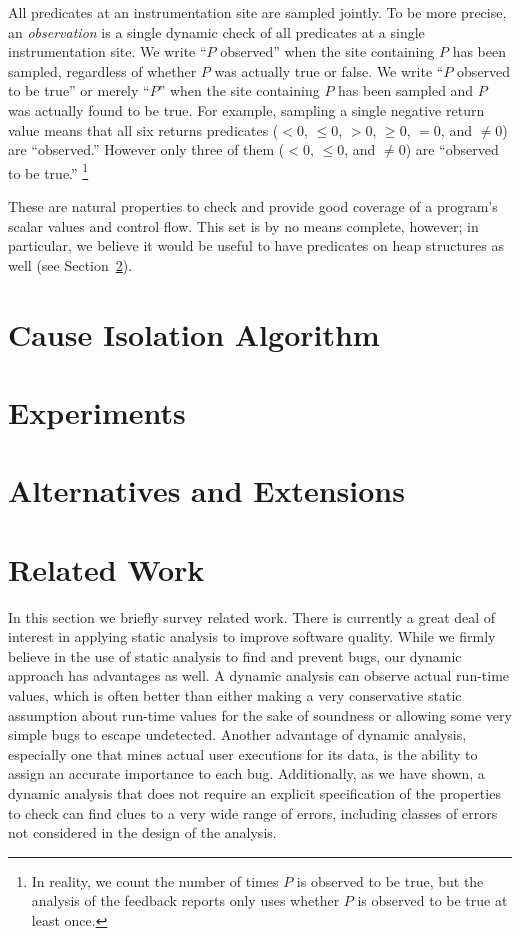 \documentclass[preprint,final]{sigplanconf}
\newcommand{\termdef}[1]{\emph{#1}}
\begin{document}
All predicates at an instrumentation site are sampled jointly.  To be
more precise, an \termdef{observation} is a single dynamic check of
all predicates at a single instrumentation site.  We write ``$P$
observed'' when the site containing $P$ has been sampled, regardless
of whether $P$ was actually true or false.  We write ``$P$ observed to
be true'' or merely ``$P$'' when the site containing $P$ has been
sampled and $P$ was actually found to be true.  For example, sampling
a single negative return value means that all six returns predicates
($< 0$, $\leq 0$, $> 0$, $\geq 0$, $= 0$, and $\neq 0$) are
``observed.''  However only three of them ($< 0$, $\leq 0$, and $\neq
0$) are ``observed to be true.''  \footnote{In reality, we count the
number of times $P$ is observed to be true, but the analysis of the
feedback reports only uses whether $P$ is observed to be true at least
once.}

  These are natural properties to check and provide good coverage of a
  program's scalar values and control flow.  This set is by no means
  complete, however; in particular, we believe it would be useful to have
  predicates on heap structures as well (see Section~\ref{sec:experiments}).

\section{Cause Isolation Algorithm}
\label{sec:algorithm}


\section{Experiments}
\label{sec:experiments}


\section{Alternatives and Extensions}
\label{sec:extensions}


\section{Related Work}
\label{sec:related-work}

In this section we briefly survey related work. There is currently a
great deal of interest in applying static analysis to improve software
quality.  While we firmly believe in the use of static analysis to
find and prevent bugs, our dynamic approach has advantages as well.  A dynamic
analysis can observe actual run-time values, which is often better
than either making a very conservative static assumption about run-time
values for the sake of soundness or allowing some very simple bugs to escape
undetected.  Another advantage of dynamic analysis, especially one
that mines actual user executions for its data, is the ability to
assign an accurate importance to each bug.  Additionally, as we have shown,
a dynamic analysis that does not require an explicit specification of
the properties to check can find clues to a very wide range of errors,
including classes of errors not considered in the design of the
analysis.
\end{document}
